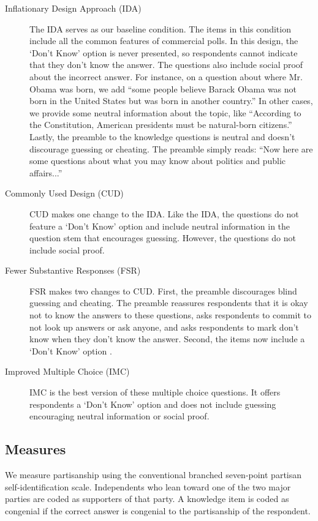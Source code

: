 \documentclass[12pt, letterpaper]{article}
\begin{document}
\begin{description}

    \item[Inflationary Design Approach (IDA)] \label{txt:IDA} The IDA serves as our baseline condition. The items in this condition include all the common features of commercial polls. In this design, the `Don't Know' option is never presented, so respondents cannot indicate that they don't know the answer. The questions also include social proof about the incorrect answer. For instance, on a question about where Mr. Obama was born, we add ``some people believe Barack Obama was not born in the United States but was born in another country.'' In other cases, we provide some neutral information about the topic, like ``According to the Constitution, American presidents must be natural-born citizens.'' Lastly, the preamble to the knowledge questions is neutral and doesn't discourage guessing or cheating. The preamble simply reads: ``Now here are some questions about what you may know about politics and public affairs...''
    
    \item[Commonly Used Design (CUD)] \label{txt:CUD} CUD makes one change to the IDA. Like the IDA, the questions do not feature a `Don't Know' option and include neutral information in the question stem that encourages guessing. However, the questions do not include social proof.

    \item[Fewer Substantive Responses (FSR)] \label{txt:FSR} FSR makes two changes to CUD. First, the preamble discourages blind guessing and cheating. The preamble reassures respondents that it is okay not to know the answers to these questions, asks respondents to commit to not look up answers or ask anyone, and asks respondents to mark don't know when they don't know the answer. Second, the items now include a `Don't Know' option \citep[see, e.g.,][]{luskin2011don, bullocketal_2015}.

    \item[Improved Multiple Choice (IMC)] \label{txt:IMC} IMC is the best version of these multiple choice questions. It offers respondents a `Don't Know' option and does not include guessing encouraging neutral information or social proof.
\end{description}



\subsection*{Measures}\label{subsec:study1_measures}
We measure partisanship using the conventional branched seven-point partisan self-identification scale. Independents who lean toward one of the two major parties are coded as supporters of that party. A knowledge item is coded as congenial if the correct answer is congenial to the partisanship of the respondent.
\end{document}
